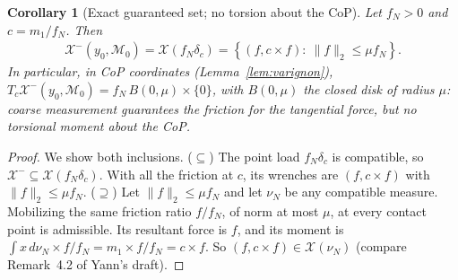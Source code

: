 \documentclass[11pt,a4paper]{article}
\theoremstyle{plain}
\newtheorem{corollary}[theorem]{Corollary}
\newcommand{\X}{\mathcal X}
\begin{document}
\begin{corollary}[Exact guaranteed set; no torsion about the CoP]
\label{cor:coarse_inner}
    Let $f_N>0$ and $c=m_1/f_N$. Then
    \begin{align}
        \X^-(y_0,\mathcal M_0)=\X(f_N\delta_c)=\left\{(f,c\times f):\ \|f\|_2\le\mu f_N\right\}.
    \end{align}
    In particular, in CoP coordinates (Lemma~\ref{lem:varignon}), $T_c\X^-(y_0,\mathcal M_0)=f_N\,B(0,\mu)\times\{0\}$, with $B(0,\mu)$ the closed disk of radius $\mu$: 
    coarse measurement guarantees the friction for the tangential force, but no torsional moment about the CoP. 
\end{corollary}
\begin{proof}
    We show both inclusions.
    ($\subseteq$) The point load $f_N\delta_c$ is compatible, so $\X^-\subseteq\X(f_N\delta_c)$. With all the friction at $c$, its wrenches are $(f,c\times f)$ with $\|f\|_2\le\mu f_N$.
    ($\supseteq$) Let $\|f\|_2\le\mu f_N$ and let $\nu_N$ be any compatible measure. Mobilizing the same friction ratio $f/f_N$, of norm at most $\mu$, at every contact point is admissible.
    Its resultant force is $f$, and its moment is $\int x\,d\nu_N\times f/f_N=m_1\times f/f_N=c\times f$. So $(f,c\times f)\in\X(\nu_N)$ (compare Remark~4.2 of Yann's draft).
\end{proof}
\end{document}
